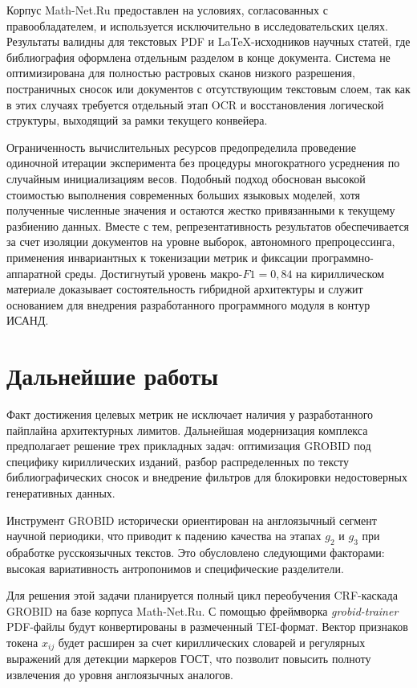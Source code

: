 Корпус Math-Net.Ru предоставлен на условиях, согласованных с правообладателем, и используется исключительно в исследовательских целях. Результаты валидны для текстовых PDF и LaTeX-исходников научных статей, где библиография оформлена отдельным разделом в конце документа. Система не оптимизирована для полностью растровых сканов низкого разрешения, постраничных сносок или документов с отсутствующим текстовым слоем, так как в этих случаях требуется отдельный этап OCR и восстановления логической структуры, выходящий за рамки текущего конвейера.

Ограниченность вычислительных ресурсов предопределила проведение одиночной итерации эксперимента без процедуры многократного усреднения по случайным инициализациям весов. Подобный подход обоснован высокой стоимостью выполнения современных больших языковых моделей, хотя полученные численные значения и остаются жестко привязанными к текущему разбиению данных. Вместе с тем, репрезентативность результатов обеспечивается за счет изоляции документов на уровне выборок, автономного препроцессинга, применения инвариантных к токенизации метрик и фиксации программно-аппаратной среды. Достигнутый уровень макро-\(F1 = 0{,}84\) на кириллическом материале доказывает состоятельность гибридной архитектуры и служит основанием для внедрения разработанного программного модуля в контур ИСАНД.

\section{Дальнейшие работы}

Факт достижения целевых метрик не исключает наличия у разработанного пайплайна архитектурных лимитов. Дальнейшая модернизация комплекса предполагает решение трех прикладных задач: оптимизация GROBID под специфику кириллических изданий, разбор распределенных по тексту библиографических сносок и внедрение фильтров для блокировки недостоверных генеративных данных.

Инструмент GROBID исторически ориентирован на англоязычный сегмент научной периодики, что приводит к падению качества на этапах $g_2$ и $g_3$ при обработке русскоязычных текстов. Это обусловлено следующими факторами: высокая вариативность антропонимов и специфические разделители.

Для решения этой задачи планируется полный цикл переобучения CRF-каскада GROBID на базе корпуса Math-Net.Ru. С помощью фреймворка \textit{grobid-trainer} PDF-файлы будут конвертированы в размеченный TEI-формат. Вектор признаков токена $x_{ij}$ будет расширен за счет кириллических словарей и регулярных выражений для детекции маркеров ГОСТ, что позволит повысить полноту извлечения до уровня англоязычных аналогов.

